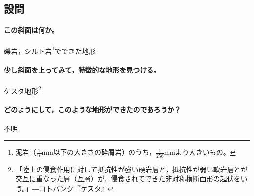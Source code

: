 \documentclass[uplatex,b5paper]{jsreport}
\begin{document}
    \subsection{設問}
        \paragraph{この斜面は何か。}
        礫岩，シルト岩\footnote{泥岩（\(\frac{1}{16}\)mm以下の大きさの砕屑岩）のうち，\(\frac{1}{256}\)mmより大きいもの。}でできた地形
        \paragraph{少し斜面を上ってみて，特徴的な地形を見つける。}
        ケスタ地形\footnote{「陸上の侵食作用に対して抵抗性が強い硬岩層と，抵抗性が弱い軟岩層とが交互に重なった層（互層）が，侵食されてできた非対称横断面形の起伏をいう。」―コトバンク『ケスタ』}
        \paragraph{どのようにして，このような地形ができたのであろうか？}
        不明
\end{document}
